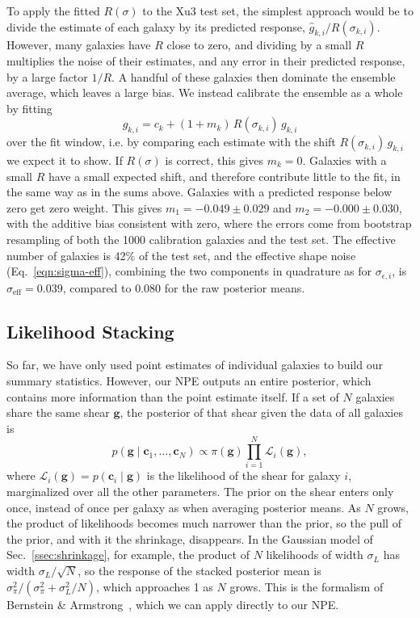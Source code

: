 To apply the fitted $R(\sigma)$ to the Xu3 test set, the simplest approach would be to divide the estimate of each galaxy by its predicted response, $\hat{g}_{k,i}/R(\sigma_{k,i})$. However, many galaxies have $R$ close to zero, and dividing by a small $R$ multiplies the noise of their estimates, and any error in their predicted response, by a large factor $1/R$. A handful of these galaxies then dominate the ensemble average, which leaves a large bias. We instead calibrate the ensemble as a whole by fitting
\begin{equation}
\label{eqn:ensemble-calibration}
    \hat{g}_{k,i} = c_k + (1+m_k)\, R(\sigma_{k,i})\, g_{k,i}
\end{equation}
over the fit window, i.e. by comparing each estimate with the shift $R(\sigma_{k,i})\,g_{k,i}$ we expect it to show. If $R(\sigma)$ is correct, this gives $m_k = 0$. Galaxies with a small $R$ have a small expected shift, and therefore contribute little to the fit, in the same way as in the sums above. Galaxies with a predicted response below zero get zero weight. This gives $m_1 = -0.049 \pm 0.029$ and $m_2 = -0.000 \pm 0.030$, with the additive bias consistent with zero, where the errors come from bootstrap resampling of both the 1000 calibration galaxies and the test set. The effective number of galaxies is 42\% of the test set, and the effective shape noise (Eq.~\ref{eqn:sigma-eff}), combining the two components in quadrature as for $\sigma_{\epsilon,i}$, is $\sigma_\mathrm{eff} = 0.039$, compared to 0.080 for the raw posterior means.

\subsection{Likelihood Stacking}
\label{ssec:stacking}

So far, we have only used point estimates of individual galaxies to build our summary statistics. However, our NPE outputs an entire posterior, which contains more information than the point estimate itself. If a set of $N$ galaxies share the same shear $\mathbf{g}$, the posterior of that shear given the data of all galaxies is
\begin{equation}
\label{eqn:stack}
    p(\mathbf{g} \mid \mathbf{c}_1, \dots, \mathbf{c}_N) \propto \pi(\mathbf{g}) \prod_{i=1}^{N} \mathcal{L}_i(\mathbf{g}),
\end{equation}
where $\mathcal{L}_i(\mathbf{g}) = p(\mathbf{c}_i \mid \mathbf{g})$ is the likelihood of the shear for galaxy $i$, marginalized over all the other parameters. The prior on the shear enters only once, instead of once per galaxy as when averaging posterior means. As $N$ grows, the product of likelihoods becomes much narrower than the prior, so the pull of the prior, and with it the shrinkage, disappears. In the Gaussian model of Sec.~\ref{ssec:shrinkage}, for example, the product of $N$ likelihoods of width $\sigma_L$ has width $\sigma_L/\sqrt{N}$, so the response of the stacked posterior mean is $\sigma_\pi^2/(\sigma_\pi^2 + \sigma_L^2/N)$, which approaches 1 as $N$ grows. This is the formalism of Bernstein \& Armstrong~\citep{BA14}, which we can apply directly to our NPE.

